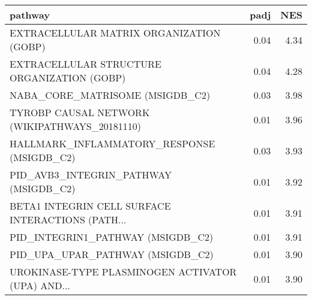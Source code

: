 \begin{tabular}{lrr}
\toprule
                                           pathway &  padj &   NES \\
\midrule
          EXTRACELLULAR MATRIX ORGANIZATION (GOBP) &  0.04 &  4.34 \\
       EXTRACELLULAR STRUCTURE ORGANIZATION (GOBP) &  0.04 &  4.28 \\
                   NABA\_CORE\_MATRISOME (MSIGDB\_C2) &  0.03 &  3.98 \\
     TYROBP CAUSAL NETWORK (WIKIPATHWAYS\_20181110) &  0.01 &  3.96 \\
        HALLMARK\_INFLAMMATORY\_RESPONSE (MSIGDB\_C2) &  0.03 &  3.93 \\
             PID\_AVB3\_INTEGRIN\_PATHWAY (MSIGDB\_C2) &  0.01 &  3.92 \\
 BETA1 INTEGRIN CELL SURFACE INTERACTIONS (PATH... &  0.01 &  3.91 \\
                 PID\_INTEGRIN1\_PATHWAY (MSIGDB\_C2) &  0.01 &  3.91 \\
                  PID\_UPA\_UPAR\_PATHWAY (MSIGDB\_C2) &  0.01 &  3.90 \\
 UROKINASE-TYPE PLASMINOGEN ACTIVATOR (UPA) AND... &  0.01 &  3.90 \\
\bottomrule
\end{tabular}
